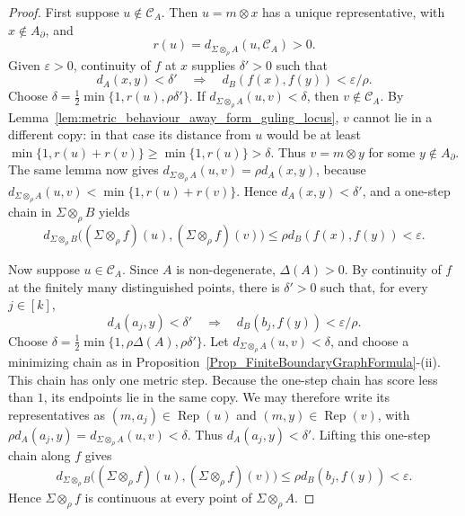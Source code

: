 \documentclass{sn-jnl}%
\theoremstyle{thmstyleone}%
\theoremstyle{thmstyletwo}%
\theoremstyle{thmstylethree}%
\newcommand{\M}{\Sigma}
\newcommand{\Fw}{\M\otimes_{\w}}
\newcommand{\w}{\rho}
\begin{document}
\begin{proof}
First suppose $u\notin \mathcal C_A$. Then $u=m\otimes x$ has a unique representative, with $x\notin A_\partial$, and
\begin{equation} 
\nonumber
    r(u)=d_{\Fw A}(u,\mathcal C_A)>0.
\end{equation}
Given $\varepsilon>0$, continuity of $f$ at $x$ supplies $\delta'>0$ such that
\begin{equation} 
\nonumber
    d_A(x,y)<\delta' \quad\Longrightarrow\quad d_B(f(x),f(y))<\varepsilon/\rho.
\end{equation}
Choose $\delta=\frac12\min\{1,r(u),\rho\delta'\}$. If $d_{\Fw A}(u,v)<\delta$, then $v\notin \mathcal C_A$. By Lemma~\ref{lem:metric_behaviour_away_form_guling_locus}, $v$ cannot lie in a different copy: in that case its distance from $u$ would be at least $\min\{1,r(u)+r(v)\}\geq\min\{1,r(u)\}>\delta$. Thus $v=m\otimes y$ for some $y\notin A_\partial$. The same lemma now gives $d_{\Fw A}(u,v)=\rho d_A(x,y)$, because $d_{\Fw A}(u,v)<\min\{1,r(u)+r(v)\}$. Hence $d_A(x,y)<\delta'$, and a one-step chain in $\Fw B$ yields
\begin{equation} 
\nonumber
    d_{\Fw B}\bigl((\Fw f)(u),(\Fw f)(v)\bigr)  \leq \rho d_B(f(x),f(y)) <\varepsilon.
\end{equation}

Now suppose $u\in \mathcal C_A$. Since $A$ is non-degenerate, $\Delta(A)>0$. By continuity of $f$ at the finitely many distinguished points, there is $\delta'>0$ such that, for every $j\in[k]$,
\begin{equation} 
\nonumber
    d_A(a_j,y)<\delta'\quad \Longrightarrow \quad d_B(b_j,f(y))<\varepsilon/  \rho.
\end{equation}
Choose $\delta=\frac12\min\{1,\rho\Delta(A),\rho\delta'\}$. Let $d_{\Fw A}(u,v)<\delta$, and choose a minimizing chain as in Proposition~\ref{Prop_FiniteBoundaryGraphFormula}-(ii). This chain has only one metric step. Because the one-step chain has score less than $1$, its endpoints lie in the same copy. We may therefore write its representatives as $(m,a_j)\in\operatorname{Rep}(u)$ and $(m,y)\in\operatorname{Rep}(v)$, with $\rho d_A(a_j,y)=d_{\Fw A}(u,v)<\delta$. Thus $d_A(a_j,y)<\delta'$. Lifting this one-step chain along $f$ gives
\begin{equation} 
\nonumber
    d_{\Fw B}\bigl((\Fw f)(u),(\Fw f)(v)\bigr) \leq \rho d_B(b_j,f(y))  <\varepsilon.
\end{equation}
Hence $\Fw f$ is continuous at every point of $\Fw A$.
\end{proof}
\end{document}
